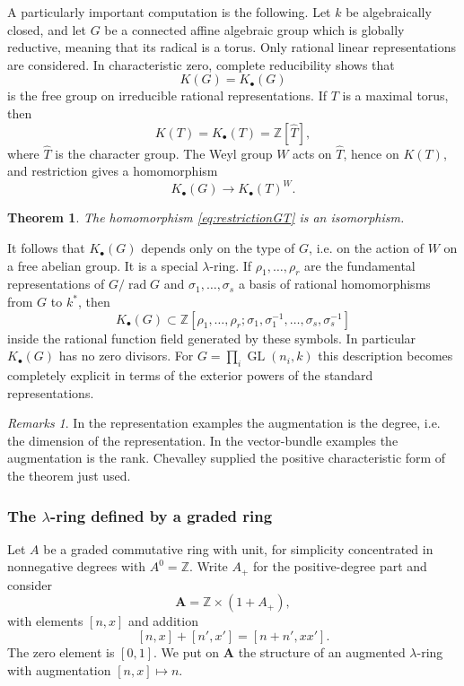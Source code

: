 \documentclass[11pt]{article}
\theoremstyle{plain}
\newtheorem*{theorem*}{Theorem}
\theoremstyle{definition}
\theoremstyle{remark}
\newtheorem{remarks}[theorem]{Remarks}
\newcommand{\ZZ}{\mathbb Z}
\DeclareMathOperator{\GL}{GL}
\providecommand{\wh}{\widehat}
\providecommand{\rad}{\operatorname{rad}}
\begin{document}
A particularly important computation is the following. Let $k$ be algebraically closed, and let $G$ be a connected affine algebraic group which is globally reductive, meaning that its radical is a torus. Only rational linear representations are considered. In characteristic zero, complete reducibility shows that
\[
   K(G)=K_{\bullet}(G)
\]
is the free group on irreducible rational representations. If $T$ is a maximal torus, then
\[
   K(T)=K_{\bullet}(T)=\ZZ[\wh T],
\]
where $\wh T$ is the character group. The Weyl group $W$ acts on $\wh T$, hence on $K(T)$, and restriction gives a homomorphism
\begin{equation}\label{eq:restrictionGT}
   K_{\bullet}(G)\to K_{\bullet}(T)^W.
\end{equation}

\begin{theorem*}
The homomorphism \eqref{eq:restrictionGT} is an isomorphism.
\end{theorem*}

It follows that $K_{\bullet}(G)$ depends only on the type of $G$, i.e. on the action of $W$ on a free abelian group. It is a special $\lambda$-ring. If $\rho_1,\ldots,\rho_r$ are the fundamental representations of $G/\rad G$ and $\sigma_1,\ldots,\sigma_s$ a basis of rational homomorphisms from $G$ to $k^*$, then
\[
K_{\bullet}(G)\subset
\ZZ[\rho_1,\ldots,\rho_r;
      \sigma_1,\sigma_1^{-1},\ldots,\sigma_s,\sigma_s^{-1}]
\]
inside the rational function field generated by these symbols. In particular $K_{\bullet}(G)$ has no zero divisors. For $G=\prod_i\GL(n_i,k)$ this description becomes completely explicit in terms of the exterior powers of the standard representations.

\begin{remarks}
In the representation examples the augmentation is the degree, i.e. the dimension of the representation. In the vector-bundle examples the augmentation is the rank. Chevalley supplied the positive characteristic form of the theorem just used.
\end{remarks}

\subsubsection{The $\lambda$-ring defined by a graded ring}

Let $A$ be a graded commutative ring with unit, for simplicity concentrated in nonnegative degrees with $A^0=\ZZ$. Write $A_+$ for the positive-degree part and consider
\[
   \mathbf A=\ZZ\times(1+A_+),
\]
with elements $[n,x]$ and addition
\[
   [n,x]+[n',x']=[n+n',xx'].
\]
The zero element is $[0,1]$. We put on $\mathbf A$ the structure of an augmented $\lambda$-ring with augmentation $[n,x]\mapsto n$.
\end{document}
